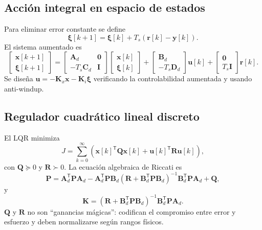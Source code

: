 \documentclass[11pt,letterpaper]{article}
\newcommand{\vect}[1]{\bm{#1}}
\newcommand{\mat}[1]{\bm{#1}}
\newcommand{\trans}{^{\mathsf T}}
\begin{document}
\subsection{Acción integral en espacio de estados}
Para eliminar error constante se define
\begin{equation}
 \vect\xi[k+1]=\vect\xi[k]+T_s(\vect r[k]-\vect y[k]).
\end{equation}
El sistema aumentado es
\begin{equation}
 \begin{bmatrix}\vect x[k+1]\\\vect\xi[k+1]\end{bmatrix}=
 \begin{bmatrix}\mat A_d&\mat 0\\-T_s\mat C_d&\mat I\end{bmatrix}
 \begin{bmatrix}\vect x[k]\\\vect\xi[k]\end{bmatrix}+
 \begin{bmatrix}\mat B_d\\-T_s\mat D_d\end{bmatrix}\vect u[k]
 +\begin{bmatrix}\mat 0\\T_s\mat I\end{bmatrix}\vect r[k].
 \label{eq:augmented}
\end{equation}
Se diseña $\vect u=-\mat K_x\vect x-\mat K_i\vect\xi$ verificando la
controlabilidad aumentada y usando anti-windup.

\subsection{Regulador cuadrático lineal discreto}
El LQR minimiza
\begin{equation}
 J=\sum_{k=0}^{\infty}
 \left(\vect x[k]\trans\mat Q\vect x[k]
 +\vect u[k]\trans\mat R\vect u[k]\right),
 \label{eq:lqrcost}
\end{equation}
con $\mat Q\succeq0$ y $\mat R\succ0$. La ecuación algebraica de Riccati es
\begin{equation}
 \mat P=\mat A_d\trans\mat P\mat A_d-
 \mat A_d\trans\mat P\mat B_d(\mat R+\mat B_d\trans\mat P\mat B_d)^{-1}
 \mat B_d\trans\mat P\mat A_d+\mat Q,
\end{equation}
y
\begin{equation}
 \mat K=(\mat R+\mat B_d\trans\mat P\mat B_d)^{-1}
 \mat B_d\trans\mat P\mat A_d.
\end{equation}
$\mat Q$ y $\mat R$ no son ``ganancias mágicas'': codifican el compromiso
entre error y esfuerzo y deben normalizarse según rangos físicos.
\end{document}
